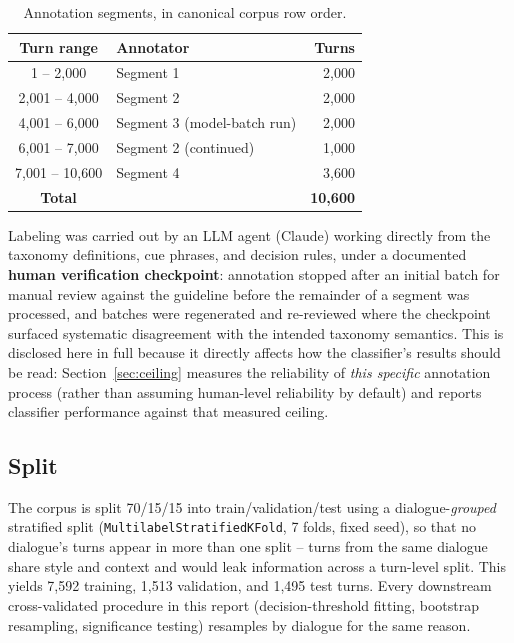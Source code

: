 \begin{table}[H]
\centering
\caption{Annotation segments, in canonical corpus row order.}
\label{tab:annotation-segments}
\begin{tabular}{@{}clr@{}}
\toprule
\textbf{Turn range} & \textbf{Annotator} & \textbf{Turns} \\
\midrule
1 -- 2{,}000 & Segment 1 & 2{,}000 \\
2{,}001 -- 4{,}000 & Segment 2 & 2{,}000 \\
4{,}001 -- 6{,}000 & Segment 3 (model-batch run) & 2{,}000 \\
6{,}001 -- 7{,}000 & Segment 2 (continued) & 1{,}000 \\
7{,}001 -- 10{,}600 & Segment 4 & 3{,}600 \\
\midrule
\textbf{Total} & & \textbf{10{,}600} \\
\bottomrule
\end{tabular}
\end{table}

Labeling was carried out by an LLM agent (Claude) working directly from the
taxonomy definitions, cue phrases, and decision rules, under a documented
\textbf{human verification checkpoint}: annotation stopped after an initial
batch for manual review against the guideline before the remainder of a
segment was processed, and batches were regenerated and re-reviewed where the
checkpoint surfaced systematic disagreement with the intended taxonomy
semantics. This is disclosed here in full because it directly affects how
the classifier's results should be read: Section~\ref{sec:ceiling} measures
the reliability of \emph{this specific} annotation process (rather than
assuming human-level reliability by default) and reports classifier
performance against that measured ceiling.

\subsection{Split}
\label{sec:split}

The corpus is split 70/15/15 into train/validation/test using a
dialogue-\emph{grouped} stratified split (\texttt{MultilabelStratifiedKFold},
7 folds, fixed seed), so that no dialogue's turns appear in more than one
split -- turns from the same dialogue share style and context and would leak
information across a turn-level split. This yields 7{,}592 training, 1{,}513
validation, and 1{,}495 test turns. Every downstream cross-validated
procedure in this report (decision-threshold fitting, bootstrap resampling,
significance testing) resamples by dialogue for the same reason.

